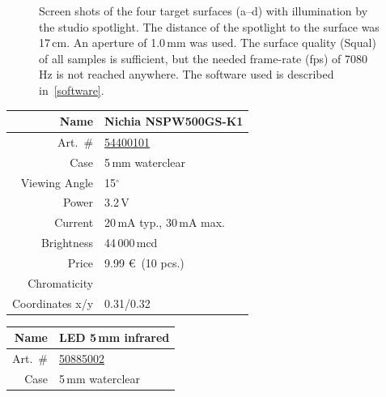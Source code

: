 \documentclass[12pt,a4paper]{article}
\begin{document}
\begin{figure}[htbp]
\begin{center}
{      }
    \caption{Screen shots of the four target surfaces (a--d) with illumination by the studio spotlight.
The distance of the spotlight to the surface was 17\,cm.
An aperture of 1.0\,mm was used.
The surface quality (Squal) of all samples is sufficient, but the needed frame-rate (fps) of 7080\,Hz is not reached anywhere.
The software used is described in~\autoref{software}.}
    \label{fig:ill-spotlight}
  \end{center}
\end{figure}

\begin{table}[htbp]
  \begin{minipage}{0.45\textwidth}
    \centering
    \begin{tabular}{r|l}
       Name  & Nichia NSPW500GS-K1     \\
       \hline
       Art.\ \# & \href{http://www.led1.de/shop/product_info.php?pName=nichia-nspw500gsk1-led-5mm-white-44000mcd-10-pcs-p-1161&cName=led-5mm-ultra-bright-white-44000mcd-nichia-c-3_276&xploidID=4a06ee48002afb920a3a4663e80b324d}{54400101} \\
       Case & 5\,mm waterclear     \\
       Viewing Angle  & 15$^\circ$     \\
       Power & 3.2\,V     \\
       Current & 20\,mA typ., 30\,mA max.     \\
       Brightness & 44\,000\,mcd     \\
       Price & 9.99 \euro\ (10 pcs.)     \\
       Chromaticity \\
       Coordinates x/y & 0.31/0.32     \\
    \end{tabular}
  \end{minipage}\hfill
  \begin{minipage}{0.45\textwidth}
    \centering
    \begin{tabular}{r|l}
       Name  & LED 5\,mm infrared     \\
      \hline
       Art.\ \# & \href{http://www.led1.de/shop/product_info.php?=&pName=led-5mm-infrared-850nm-120mw-10-pcs-p-1349&cName=led-5mm-ultra-bright-infrared-850nm-120mw-c-3_277&xploidID=4a06ee48002afb920a3a4663e80b324d}{50885002} \\
       Case & 5\,mm waterclear     \\

\end{tabular}
\end{minipage}
\end{table}
\end{document}
